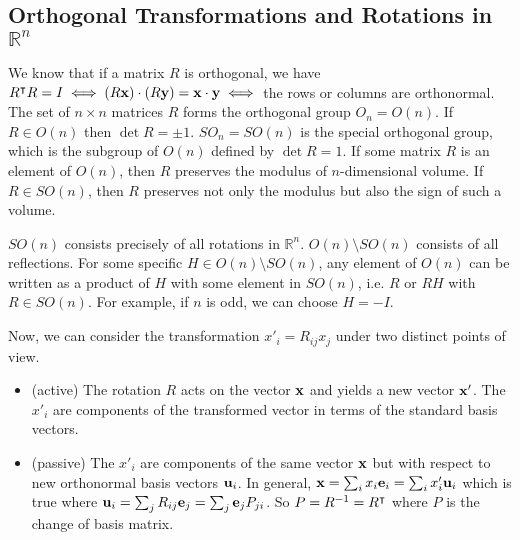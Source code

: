 \subsection{Orthogonal Transformations and Rotations in $\mathbb R^n$}
We know that if a matrix $R$ is orthogonal, we have $R^\intercal R = I \iff (R\vb x) \cdot (R\vb y) = \vb x \cdot \vb y \iff$ the rows or columns are orthonormal. The set of $n \times n$ matrices $R$ forms the orthogonal group $O_n = O(n)$. If $R \in O(n)$ then $\det R = \pm 1$. $SO_n = SO(n)$ is the special orthogonal group, which is the subgroup of $O(n)$ defined by $\det R = 1$. If some matrix $R$ is an element of $O(n)$, then $R$ preserves the modulus of $n$-dimensional volume. If $R \in SO(n)$, then $R$ preserves not only the modulus but also the sign of such a volume.

$SO(n)$ consists precisely of all rotations in $\mathbb R^n$. $O(n) \setminus SO(n)$ consists of all reflections. For some specific $H \in O(n) \setminus SO(n)$, any element of $O(n)$ can be written as a product of $H$ with some element in $SO(n)$, i.e. $R$ or $RH$ with $R \in SO(n)$. For example, if $n$ is odd, we can choose $H = -I$.

Now, we can consider the transformation $x'_i = R_{ij} x_j$ under two distinct points of view.
\begin{itemize}
	\item (active) The rotation $R$ acts on the vector $\vb x$ and yields a new vector $\vb x'$. The $x'_i$ are components of the transformed vector in terms of the standard basis vectors.
	\item (passive) The $x'_i$ are components of the same vector $\vb x$ but with respect to new orthonormal basis vectors $\vb u_i$. In general, $\vb x = \sum_i x_i \vb e_i = \sum_i x'_i \vb u_i$ which is true where $\vb u_i = \sum_j R_{ij} \vb e_j = \sum_j \vb e_j P_{ji}$. So $P = R^{-1} = R^\intercal$ where $P$ is the change of basis matrix.
\end{itemize}

